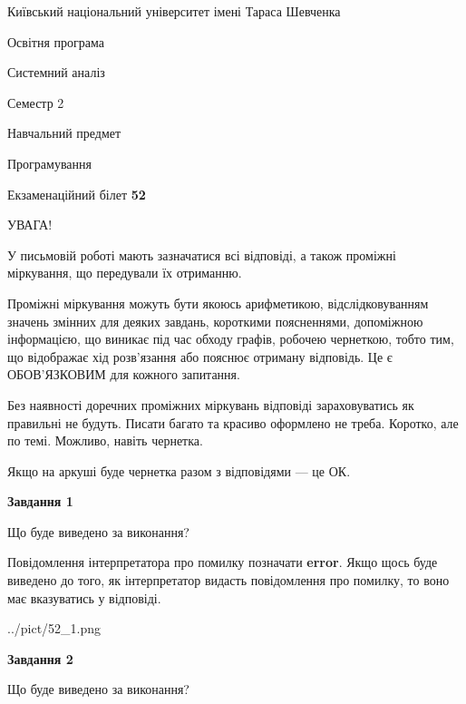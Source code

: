 \documentclass[12pt, ukrainian]{article}
\begin{document}
{{\begin {small}\par
{ \center  Київський національний університет імені Тараса Шевченка \par}
{\parbox {5 cm}{Освітня програма \hfill}{\parbox {7 cm}{Системний аналіз \hfill}}\parbox {6 cm}{\hfill Семестр 2}}\par
{\parbox {5 cm} {Навчальний предмет \hfill}\parbox {7 cm}{Програмування \hfill}\parbox {6cm}{\hfill}\par}\vspace{-7pt} \end{small}}{\center Екзаменаційний білет \No \textbf
{ 52 }\par}}
{
\begin {large}
УВАГА!

У письмовій роботі мають зазначатися всі відповіді, а також проміжні міркування, що передували їх отриманню.

Проміжні міркування можуть бути якоюсь арифметикою, відслідковуванням зна\-чень змінних для деяких завдань,
короткими поясненнями, допоміжною інформацією, що виникає під час обходу графів, робочею чернеткою,
тобто тим, що відображає хід розв’язання або пояснює отриману відповідь.
Це є ОБОВ’ЯЗКОВИМ для кожного запитання.

Без наявності доречних проміжних міркувань відповіді зараховуватись як правиль\-ні не будуть.
Писати багато та красиво оформлено не треба. Коротко, але по темі. Можли\-во, навіть чернетка.

Якщо на аркуші буде чернетка разом з відповідями --- це ОК.

\newpage

{\begin {center}\textbf{Завдання 1}\end {center}}\par
Що буде виведено за виконання?

Повідомлення інтерпретатора про помилку позначати \textbf{error}.
Якщо щось буде виведено до того, як інтерпретатор видасть повідомлення про помилку, 
то воно має вказуватись у відповіді. \par


\begin{center}
	{../pict/52_1.png}
\end{center}
\newpage

{\begin {center}\textbf{Завдання 2}\end {center}}\par
Що буде виведено за виконання?


\end{large}}
\end{document}
